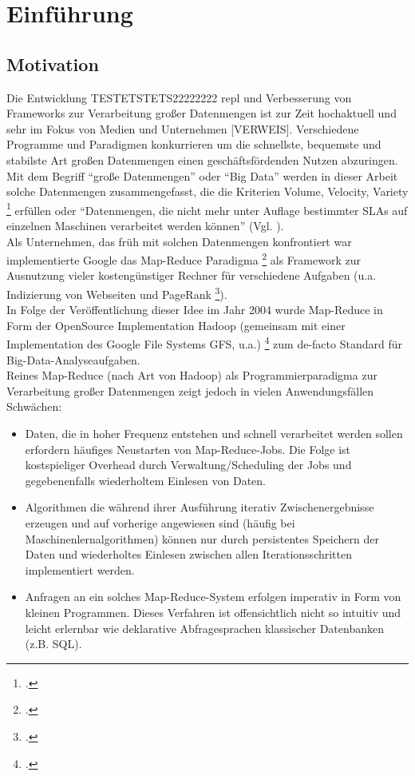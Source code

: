\chapter{Einführung}

\section{Motivation}

Die Entwicklung TESTETSTETS22222222 \gls{repl} und Verbesserung von Frameworks zur Verarbeitung großer Datenmengen ist zur Zeit hochaktuell und sehr im Fokus von Medien und Unternehmen [VERWEIS]. Verschiedene Programme und Paradigmen konkurrieren um die schnellste, bequemste und stabilste Art großen Datenmengen einen geschäftsfördenden Nutzen abzuringen.\\

Mit dem Begriff "`große Datenmengen"' oder "`Big Data"' werden in dieser Arbeit solche Datenmengen zusammengefasst, die die Kriterien Volume, Velocity, Variety \footcite{Lan01} erfüllen oder "`Datenmengen, die nicht mehr unter Auflage bestimmter SLAs auf einzelnen Maschinen verarbeitet werden können"' (Vgl. \cite{Sam14}).\\

Als Unternehmen, das früh mit solchen Datenmengen konfrontiert war implementierte Google das Map-Reduce Paradigma \footcite{Dean04} als Framework zur Ausnutzung vieler kostengünstiger Rechner für verschiedene Aufgaben (u.a.  Indizierung von Webseiten und PageRank \footcite{page2001method}). \\

In Folge der Veröffentlichung dieser Idee im Jahr 2004 wurde Map-Reduce in Form der OpenSource Implementation Hadoop (gemeinsam mit einer Implementation des Google File Systems GFS, u.a.) \footcite{Ghema03} zum de-facto Standard für Big-Data-Analyseaufgaben.\\

Reines Map-Reduce (nach Art von Hadoop) als Programmierparadigma zur Verarbeitung großer Datenmengen zeigt jedoch in vielen Anwendungsfällen Schwächen:
\begin{itemize}
	\item Daten, die in hoher Frequenz entstehen und schnell verarbeitet werden sollen erfordern häufiges Neustarten von Map-Reduce-Jobs. Die Folge ist kostspieliger Overhead durch Verwaltung/Scheduling der Jobs und gegebenenfalls wiederholtem Einlesen von Daten.
	\item Algorithmen die während ihrer Ausführung iterativ Zwischenergebnisse erzeugen und auf vorherige angewiesen sind (häufig bei Maschinenlernalgorithmen) können nur durch persistentes Speichern der Daten und wiederholtes Einlesen zwischen allen Iterationsschritten implementiert werden.
	\item Anfragen an ein solches Map-Reduce-System erfolgen imperativ in Form von kleinen Programmen. Dieses Verfahren ist offensichtlich nicht so intuitiv und leicht erlernbar wie deklarative Abfragesprachen klassischer Datenbanken (z.B. SQL).
\end{itemize}

